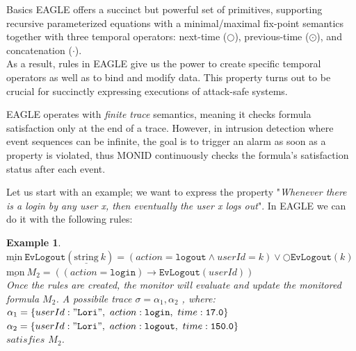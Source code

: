 \documentclass[aspectratio=169,t,xcolor=table]{beamer}
\newtheorem{ex}{Example}
\begin{document}
\begin{frame}[allowframebreaks]{Basics}
    EAGLE offers a succinct but powerful set of primitives, supporting recursive parameterized equations with a minimal/maximal fix-point semantics together with three temporal operators: next-time ($\bigcirc$), previous-time ($\odot$), and concatenation ($\cdot$).\\
    \vspace{2.5mm}
    As a result, rules in EAGLE give us the power to create specific temporal operators as well as to bind and modify data. This property turns out to be crucial for succinctly expressing executions of attack-safe systems.

    \vspace{2.5mm}
    EAGLE operates with \textit{finite trace} semantics, meaning it checks formula satisfaction only at the end of a trace. However, in intrusion detection where event sequences can be infinite, the goal is to trigger an alarm as soon as a property is violated, thus MONID continuously checks the formula's satisfaction status after each event.

    Let us start with an example; we want to express the property "\textit{Whenever there is a login by any user x, then eventually the user x logs out}". In EAGLE we can do it with the following rules:
    \begin{ex} 
    \vspace{2.5mm}
    $ \underline{\text{min}}\ \mathtt{EvLogout}(\underline{\text{string}}\ k) = (action = \mathtt{logout}\land userId = k) \lor \bigcirc \mathtt{EvLogout}(k) $\\
    $  \underline{\text{mon}}\ M_2 = ((action = \mathtt{login})\rightarrow \mathtt{EvLogout}(userId)) $\\
    \vspace{2.5mm}
    Once the rules are created, the monitor will evaluate and update the monitored formula $M_2$. 
    A possibile trace $\sigma=\alpha_1,\alpha_2 $ , where:\\
    \vspace{2.5mm} 
    $\alpha_1=\{userId:\mathtt{"Lori"},\ action:\mathtt{login},\ time:\mathtt{17.0}\}$ \\$\alpha_2=\{userId:\mathtt{"Lori"},\ action:\mathtt{logout},\ time:\mathtt{150.0}\}$\\ 
    \vspace{2.5mm}
    $satisfies$ $M_2$.
    \end{ex}
\end{frame}
\end{document}

